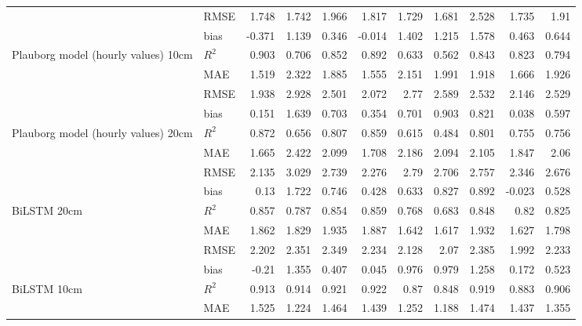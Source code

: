 \begin{tabular}{llrrrrrrrrr}
                                     & RMSE  &  1.748 & 1.742 &  1.966 &  1.817 & 1.729 &  1.681 & 2.528 &  1.735 &     1.91  \\
                                     & bias  & -0.371 & 1.139 &  0.346 & -0.014 & 1.402 &  1.215 & 1.578 &  0.463 &     0.644 \\
 Plauborg model (hourly values) 10cm & $R^2$ &  0.903 & 0.706 &  0.852 &  0.892 & 0.633 &  0.562 & 0.843 &  0.823 &     0.794 \\
                                     & MAE   &  1.519 & 2.322 &  1.885 &  1.555 & 2.151 &  1.991 & 1.918 &  1.666 &     1.926 \\
                                     & RMSE  &  1.938 & 2.928 &  2.501 &  2.072 & 2.77  &  2.589 & 2.532 &  2.146 &     2.529 \\
                                     & bias  &  0.151 & 1.639 &  0.703 &  0.354 & 0.701 &  0.903 & 0.821 &  0.038 &     0.597 \\
 Plauborg model (hourly values) 20cm & $R^2$ &  0.872 & 0.656 &  0.807 &  0.859 & 0.615 &  0.484 & 0.801 &  0.755 &     0.756 \\
                                     & MAE   &  1.665 & 2.422 &  2.099 &  1.708 & 2.186 &  2.094 & 2.105 &  1.847 &     2.06  \\
                                     & RMSE  &  2.135 & 3.029 &  2.739 &  2.276 & 2.79  &  2.706 & 2.757 &  2.346 &     2.676 \\
                                     & bias  &  0.13  & 1.722 &  0.746 &  0.428 & 0.633 &  0.827 & 0.892 & -0.023 &     0.528 \\
 BiLSTM 20cm                         & $R^2$ &  0.857 & 0.787 &  0.854 &  0.859 & 0.768 &  0.683 & 0.848 &  0.82  &     0.825 \\
                                     & MAE   &  1.862 & 1.829 &  1.935 &  1.887 & 1.642 &  1.617 & 1.932 &  1.627 &     1.798 \\
                                     & RMSE  &  2.202 & 2.351 &  2.349 &  2.234 & 2.128 &  2.07  & 2.385 &  1.992 &     2.233 \\
                                     & bias  & -0.21  & 1.355 &  0.407 &  0.045 & 0.976 &  0.979 & 1.258 &  0.172 &     0.523 \\
 BiLSTM 10cm                         & $R^2$ &  0.913 & 0.914 &  0.921 &  0.922 & 0.87  &  0.848 & 0.919 &  0.883 &     0.906 \\
                                     & MAE   &  1.525 & 1.224 &  1.464 &  1.439 & 1.252 &  1.188 & 1.474 &  1.437 &     1.355 \\

\end{tabular}
